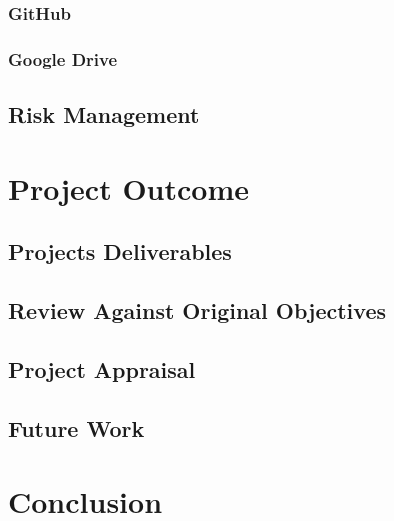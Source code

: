 \documentclass[12pt,a4paper,twoside]{report}
\begin{document}
		\subsection{GitHub}
		\subsection{Google Drive}
	\section{Risk Management}

\chapter{Project Outcome}
	\section{Projects Deliverables}
	\section{Review Against Original Objectives}
	\section{Project Appraisal}
	\section{Future Work}

\chapter{Conclusion}




\end{document}
